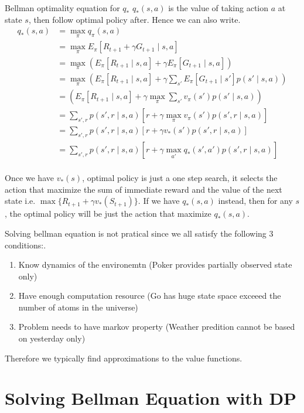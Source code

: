 \documentclass[twocolumn, 10pt]{article}
\begin{document}
Bellman optimality equation for $q_*$
 $q_*(s,a)$ is the value of taking action $a$ at state $s$, then follow optimal policy after. Hence we can also write.
$$ 
\begin{aligned}
q_*(s, a) &= \max_{\pi} q_{\pi} (s, a) \\
&= \max_{\pi} E_{\pi} [R_{t+1} + \gamma G_{t+1} \mid s, a] \\
& = \max_{\pi} \left( E_{\pi}[R_{t+1} \mid s, a]  + \gamma E_{\pi}[ G_{t+1}  \mid s, a]  \right)\\
&= \max_{\pi}  \left( E_{\pi}[R_{t+1} \mid s, a]  +  \gamma \sum_{s'} E_{\pi}[ G_{t+1} \mid s'] p(s' \mid s, a)  \right)\\
&=\left( E_{\pi}[R_{t+1} \mid s, a]  +  \gamma  \max_{\pi}   \sum_{s'} v_{\pi}(s') p(s' \mid s, a)  \right)\\
&= \sum_{s', r }  p(s', r \mid s, a) \left[ r +  \gamma  \max_{\pi}  v_{\pi}(s') p(s', r \mid s, a) \right] \\
&= \sum_{s', r }  p(s', r \mid s, a) \left[ r +  \gamma  v_{*}(s') p(s', r \mid s, a) \right] \\
&= \sum_{s', r }  p(s', r \mid s, a) \left[ r +  \gamma  \max_{a'} q_{*}(s', a') p(s', r \mid s, a) \right] \\
\end{aligned}$$

Once we have $v_*(s)$, optimal policy is just a one step search, it selects the action that maximize the sum of immediate reward and the value of the next state i.e.  $\max\{R_{t+1} + \gamma v_*(S_{t+1})\}$.  If we have $q_*(s, a)$ instead, then for any $s$,  the optimal policy will be just the action that maximize $q_*(s, a)$.

Solving bellman equation is not pratical since we all satisfy the following 3 conditions:.
\begin{enumerate}
  \item Know dynamics of the environemtn (Poker provides partially observed state only)
 \item  Have  enough computation resource (Go has huge state space exceeed the number of atoms in the universe)
 \item  Problem needs to have markov property (Weather predition cannot be based on yesterday only)
\end{enumerate}
 Therefore we typically find approximations to the value functions.
 
 \section*{Solving Bellman Equation with DP}
 
\end{document}
